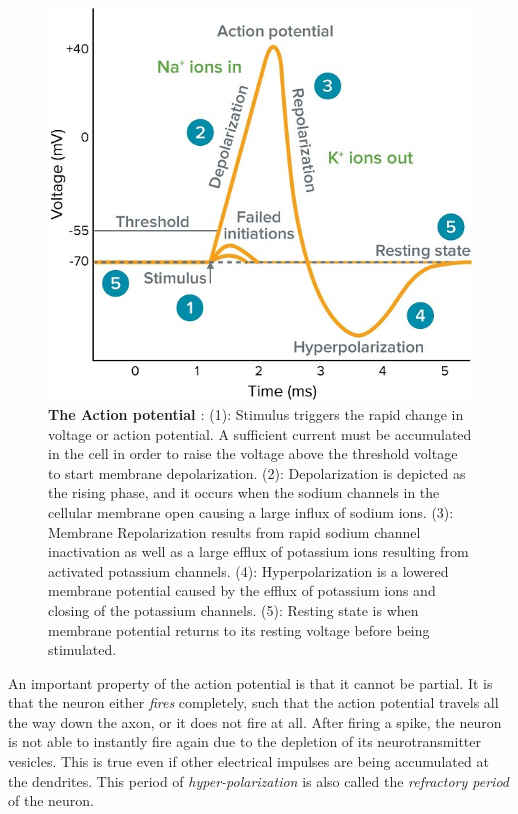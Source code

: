 \begin{figure}[ht!]
  \centering
  \includegraphics[width=\linewidth]{src/pic/what-is-action-potential.jpg}
  \caption{\textbf{The Action potential \citep[taken from][]{what-action-potential}}: (1): Stimulus triggers the rapid change in voltage or action potential. A sufficient current must be accumulated in the cell in order to raise the voltage above the threshold voltage to start membrane depolarization. (2): Depolarization is depicted as the rising phase, and it occurs when the sodium channels in the cellular membrane open causing a large influx of sodium ions. (3): Membrane Repolarization results from rapid sodium channel inactivation as well as a large efflux of potassium ions resulting from activated potassium channels. (4): Hyperpolarization is a lowered membrane potential caused by the efflux of potassium ions and closing of the potassium channels. (5): Resting state is when membrane potential returns to its resting voltage before being stimulated.}
  \label{fig:action_potential}
\end{figure}

An important property of the action potential is that it cannot be partial. It is that the neuron either \emph{fires} completely, such that the action potential travels all the way down the axon, or it does not fire at all. After firing a spike, the neuron is not able to instantly fire again due to the depletion of its neurotransmitter vesicles. This is true even if other electrical impulses are being accumulated at the dendrites. This period of \emph{hyper-polarization} is also called the \emph{refractory period} of the neuron.

